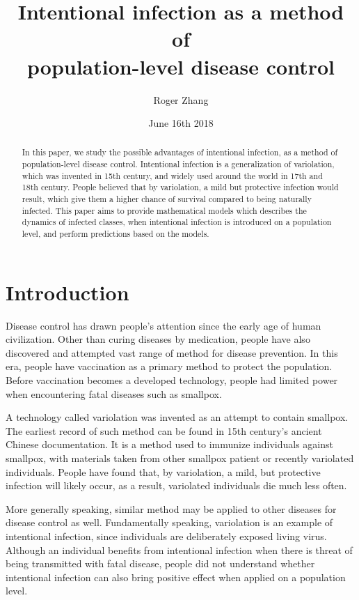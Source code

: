 \documentclass[12pt]{article}
\title{Intentional infection as a method of\\population-level disease control}
\author{Roger Zhang}
\date{June 16th 2018}
\begin{document}
\linenumbers
\maketitle
\begin{abstract}
In this paper, we study the possible advantages of intentional infection, as a method of population-level disease control. Intentional infection is a generalization of variolation, which was invented in 15th century, and widely used around the world in 17th and 18th century. People believed that by variolation, a mild but protective infection would result, which give them a higher chance of survival compared to being naturally infected. This paper aims to provide mathematical models which describes the dynamics of infected classes, when intentional infection is introduced on a population level, and perform predictions based on the models.
\end{abstract}
\clearpage
\tableofcontents
\clearpage
\section{Introduction}
Disease control has drawn people's attention since the early age of human civilization. Other than curing diseases by medication, people have also discovered and attempted vast range of method for disease prevention. In this era, people have vaccination as a primary method to protect the population. Before vaccination becomes a developed technology, people had limited power when encountering fatal diseases such as smallpox.

A technology called variolation was invented as an attempt to contain smallpox. The earliest record of such method can be found in 15th century's ancient Chinese documentation. It is a method used to immunize individuals against smallpox, with materials taken from other smallpox patient or recently variolated individuals. People have found that, by variolation, a mild, but protective infection will likely occur, as a result, variolated individuals die much less often.

More generally speaking, similar method may be applied to other diseases for disease control as well. Fundamentally speaking, variolation is an example of intentional infection, since individuals are deliberately exposed living virus. Although an individual benefits from intentional infection when there is threat of being transmitted with fatal disease, people did not understand whether intentional infection can also bring positive effect when applied on a population level. 
\end{document}
